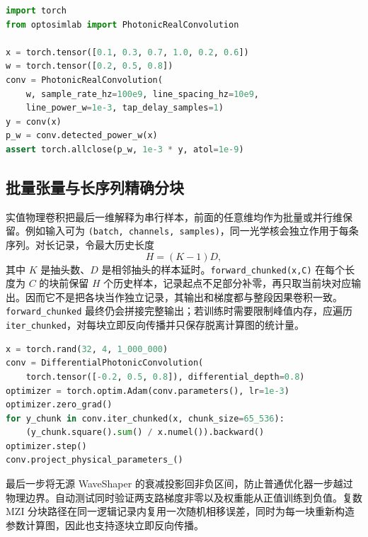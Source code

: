 \documentclass[11pt,a4paper,UTF8]{ctexart}
\newcommand{\pkg}[1]{\texttt{#1}}
\begin{document}
\begin{lstlisting}[language=Python]
import torch
from optosimlab import PhotonicRealConvolution

x = torch.tensor([0.1, 0.3, 0.7, 1.0, 0.2, 0.6])
w = torch.tensor([0.2, 0.5, 0.8])
conv = PhotonicRealConvolution(
    w, sample_rate_hz=100e9, line_spacing_hz=10e9,
    line_power_w=1e-3, tap_delay_samples=1)
y = conv(x)
p_w = conv.detected_power_w(x)
assert torch.allclose(p_w, 1e-3 * y, atol=1e-9)
\end{lstlisting}

\subsection{批量张量与长序列精确分块}
实值物理卷积把最后一维解释为串行样本，前面的任意维均作为批量或并行维保留。例如输入可为 \pkg{(batch, channels, samples)}，同一光学核会独立作用于每条序列。对长记录，令最大历史长度
\begin{equation}
H=(K-1)D,
\end{equation}
其中 $K$ 是抽头数、$D$ 是相邻抽头的样本延时。\pkg{forward\_chunked(x,C)} 在每个长度为 $C$ 的块前保留 $H$ 个历史样本，记录起点不足部分补零，再只取当前块对应输出。因而它不是把各块当作独立记录，其输出和梯度都与整段因果卷积一致。\pkg{forward\_chunked} 最终仍会拼接完整输出；若训练时需要限制峰值内存，应遍历 \pkg{iter\_chunked}，对每块立即反向传播并只保存脱离计算图的统计量。

\begin{lstlisting}[language=Python]
x = torch.rand(32, 4, 1_000_000)
conv = DifferentialPhotonicConvolution(
    torch.tensor([-0.2, 0.5, 0.8]), differential_depth=0.8)
optimizer = torch.optim.Adam(conv.parameters(), lr=1e-3)
optimizer.zero_grad()
for y_chunk in conv.iter_chunked(x, chunk_size=65_536):
    (y_chunk.square().sum() / x.numel()).backward()
optimizer.step()
conv.project_physical_parameters_()
\end{lstlisting}
最后一步将无源 WaveShaper 的衰减投影回非负区间，防止普通优化器一步越过物理边界。自动测试同时验证两支路梯度非零以及权重能从正值训练到负值。复数 MZI 分块路径在同一逻辑记录内复用一次随机相移误差，同时为每一块重新构造参数计算图，因此也支持逐块立即反向传播。
\end{document}
